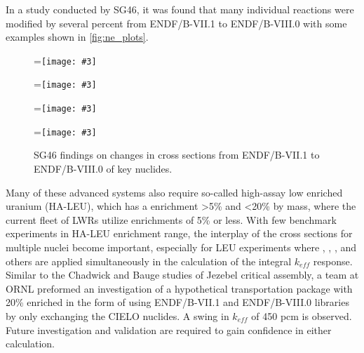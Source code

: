 \documentclass[letterpaper,draft]{ar-1col}
\newcommand{\subfigimg}[4][,]{%
  \setbox1=\hbox{\noindent\texttt{[image: \#3]}}%
  \leavevmode\rlap{\usebox1}%
  \rlap{\hspace*{#4pt}\raisebox{\dimexpr\ht1-2\baselineskip}{#2}}%
  \phantom{\usebox1}%
}
\begin{document}
In a study conducted by SG46, it was found that many individual reactions were modified by several percent from ENDF/B-VII.1 to ENDF/B-VIII.0 with some examples shown in \autoref{fig:ne_plots}.


\begin{figure}
    \centering
        \centering
        \hspace{-5pt}\subfigimg[width=0.5\textwidth]{}{u235.png}{50}
   \hspace{-5pt}%
        \centering
        \subfigimg[width=0.5\textwidth]{}{u238.png}{50}
   \hspace{-5pt}%
       \centering
        \centering
        \hspace{-5pt}\subfigimg[width=0.5\textwidth]{}{pu239_1.png}{50}
   \hspace{-5pt}%
        \centering
        \subfigimg[width=0.5\textwidth]{}{pu239_2.png}{50}
   \hspace{-5pt}%
    \caption{SG46 findings on changes in cross sections from ENDF/B-VII.1 to ENDF/B-VIII.0 of key nuclides. }
     \label{fig:ne_plots}
\end{figure}

Many of these advanced systems also require so-called high-assay low enriched uranium (HA-LEU), which has a  enrichment \textgreater5\% and \textless20\% by mass, where the current fleet of LWRs utilize enrichments of 5\% or less. With few benchmark experiments in HA-LEU enrichment range, the interplay of the cross sections for multiple nuclei become important, especially for LEU experiments where , , ,  and others are applied simultaneously in the calculation of the integral $k_{eff}$ response.  Similar to the Chadwick \cite{Cha18} and Bauge \cite{Bau12} studies of Jezebel critical assembly, a team at ORNL preformed an investigation of a hypothetical transportation package with 20\% enriched  in the form of  using ENDF/B-VII.1 and ENDF/B-VIII.0 libraries by only exchanging the CIELO nuclides. A swing in $k_{eff}$ of 450 pcm is observed.  Future investigation and validation are required to gain confidence in either calculation.
\end{document}
